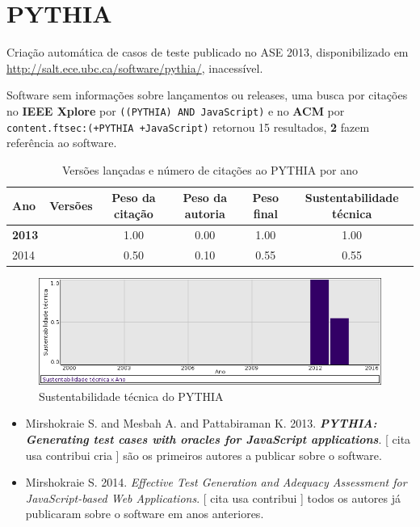 \section{PYTHIA}

Criação automática de casos de teste
publicado no ASE 2013,
disponibilizado em \url{http://salt.ece.ubc.ca/software/pythia/},
inacessível.

Software sem informações sobre lançamentos ou releases,
uma busca por citações no {\bf IEEE Xplore} por
\texttt{((PYTHIA) AND JavaScript)}
e no {\bf ACM} por
\texttt{content.ftsec:(+PYTHIA +JavaScript)}
retornou
15 resultados,
{\bf 2} fazem referência ao software.


\begin{table}[H]
\caption{Versões lançadas e número de citações ao PYTHIA por ano}
\centering
\begin{tabular}{| l | c | c | c | c | c |}
  \hline
  Ano & Versões & Peso da citação & Peso da autoria & Peso final & Sustentabilidade técnica \\
  \hline
            {\bf 2013}
          &
          
          &
          1.00
          &
          0.00
          &
          1.00
          &
            {\color{blue} 1.00}
          \\
\hline
            2014
          &
          
          &
          0.50
          &
          0.10
          &
          0.55
          &
            {\color{blue} 0.55}
          \\
\hline
\end{tabular}
\end{table}

\begin{figure}[h]
  \center
  \includegraphics[scale=0.50]{result-documents/charts/pythia.png}
  \caption{Sustentabilidade técnica do PYTHIA}
\end{figure}


\begin{itemize}
\item Mirshokraie S. and Mesbah A. and Pattabiraman K.
      2013.
        \textbf{\textit{ PYTHIA: Generating test cases with oracles for JavaScript applications}}.
      [
          cita
          usa
          contribui
          cria
      ]
são os primeiros autores a publicar sobre o software.
\item Mirshokraie S.
      2014.
        \textit{ Effective Test Generation and Adequacy Assessment for JavaScript-based Web Applications}.
      [
          cita
          usa
          contribui
      ]
todos os autores já publicaram sobre o software em anos anteriores.
\end{itemize}

